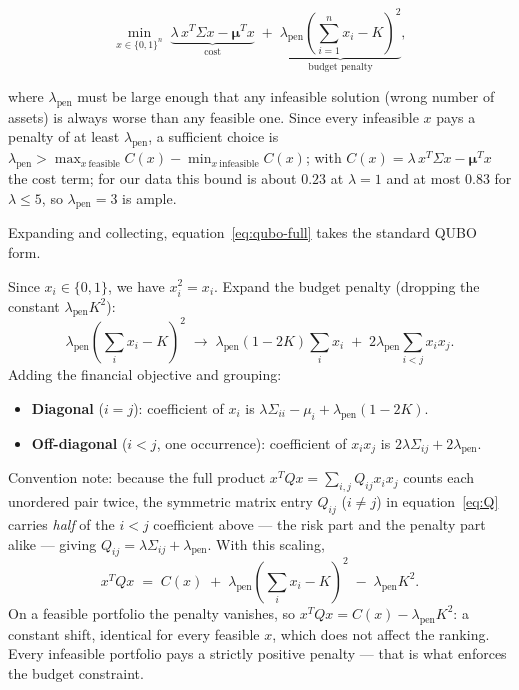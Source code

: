 \documentclass[a4paper,11pt]{article}
\begin{document}
\begin{equation}
    \min_{x\in\{0,1\}^n}\;
    \underbrace{\lambda\, x^T\Sigma x - \boldsymbol\mu^T x}_{\text{cost}}
    \;+\;
    \underbrace{\lambda_\text{pen}\!\left(\sum_{i=1}^n x_i - K\right)^{\!2}}_{\text{budget penalty}},
    \label{eq:qubo-full}
\end{equation}

where $\lambda_\text{pen}$ must be large enough that any infeasible
solution (wrong number of assets) is always worse than any feasible one.
Since every infeasible $x$ pays a penalty of at least $\lambda_\text{pen}$, a sufficient
choice is $\lambda_\text{pen} > \max_{x\ \text{feasible}} C(x) - \min_{x\ \text{infeasible}} C(x)$;
with $C(x) = \lambda\, x^T\Sigma x - \boldsymbol\mu^T x$ the cost term; for our data this bound is about
$0.23$ at $\lambda = 1$ and at most $0.83$ for $\lambda \le 5$, so $\lambda_\text{pen} = 3$ is ample.

Expanding and collecting, equation~\eqref{eq:qubo-full} takes the
standard QUBO form.

\begin{warningbox}
Since $x_i \in \{0,1\}$, we have $x_i^2 = x_i$.
Expand the budget penalty (dropping the constant $\lambda_\text{pen}K^2$):
\[
    \lambda_\text{pen}\!\left(\sum_i x_i - K\right)^{\!2}
    \;\longrightarrow\;
    \lambda_\text{pen}(1-2K)\!\sum_i x_i
    \;+\; 2\lambda_\text{pen}\!\sum_{i<j} x_i x_j.
\]
Adding the financial objective and grouping:
\begin{itemize}
  \item \textbf{Diagonal} ($i=j$): coefficient of $x_i$ is
        $\lambda\Sigma_{ii} - \mu_i + \lambda_\text{pen}(1-2K)$.
  \item \textbf{Off-diagonal} ($i<j$, one occurrence): coefficient of $x_ix_j$ is
        $2\lambda\Sigma_{ij} + 2\lambda_\text{pen}$.
\end{itemize}
Convention note: because the full product $x^TQx = \sum_{i,j}Q_{ij}x_ix_j$ counts
each unordered pair twice, the symmetric matrix entry $Q_{ij}$ ($i\neq j$) in
equation~\eqref{eq:Q} carries \emph{half} of the $i<j$ coefficient above — the
risk part and the penalty part alike — giving
$Q_{ij}=\lambda\Sigma_{ij}+\lambda_\text{pen}$.
With this scaling,
\[
    x^TQx \;=\; C(x) \;+\; \lambda_\text{pen}\!\left(\sum_i x_i - K\right)^{\!2}
    \;-\; \lambda_\text{pen}K^2 .
\]
On a feasible portfolio the penalty vanishes, so $x^TQx = C(x) - \lambda_\text{pen}K^2$:
a constant shift, identical for every feasible $x$, which does not affect the ranking.
Every infeasible portfolio pays a strictly positive penalty — that is what enforces
the budget constraint.
\end{warningbox}
\end{document}

